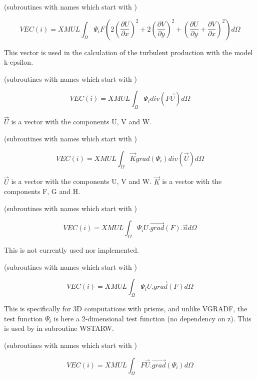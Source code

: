 
(subroutines with names which start with )

\[VEC(i)=XMUL \int _{\Omega }\Psi _{i}  F   (2 (\frac{\partial U}{\partial x} )^{2} +2 (\frac{\partial V}{\partial y} )^{2} +(\frac{\partial U}{\partial y} +\frac{\partial V}{\partial x} )^{2} )    d\Omega  \]

This vector is used in the calculation of the turbulent production with the
model k-epsilon.


(subroutines with names which start with )

\[VEC(i)=XMUL \int _{\Omega }\Psi _{i}  div(F \vec{U})  d\Omega  \]

$\vec{U}$ is a vector with the components U, V and W.


(subroutines with names which start with )

\[VEC(i)=XMUL \int _{\Omega }\vec{K} grad(\Psi _{i} )   div(\vec{U}) d\Omega  \]

$\vec{U}$ is a vector with the components U, V and W.
$\vec{K}$ is a vector with the components F, G and H.


(subroutines with names which start with )

\[VEC(i)=XMUL \int _{\Omega }\Psi _{i}  U . \overrightarrow{grad} ( F ).\vec{n}  d\Omega  \]

This is not currently used nor implemented.


(subroutines with names which start with )

\[VEC(i)=XMUL \int _{\Omega }\Psi _{i}  U . \overrightarrow{grad} ( F )  d\Omega  \]

This is specifically for 3D computations with prisms, and unlike VGRADF, the
test function $\Psi _{i} $ is here a 2-dimensional test function (no dependency
on z). This is used by  in subroutine WSTARW.


(subroutines with names which start with )

\[VEC(i)=XMUL \int _{\Omega }F \vec{U} . \overrightarrow{grad} ( \Psi _{i}  )  d\Omega  \]

